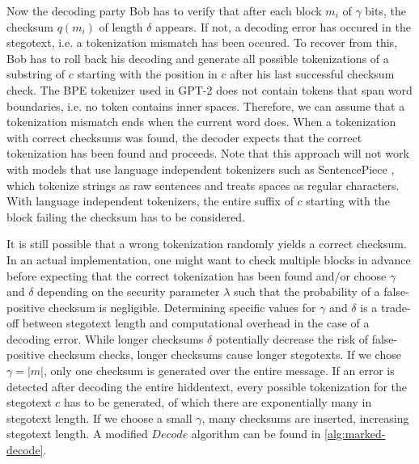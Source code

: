Now the decoding party Bob has to verify that after each block $m_i$ of $\gamma$ bits, the checksum $q(m_i)$ of length $\delta$ appears.
If not, a decoding error has occured in the stegotext, i.e. a tokenization mismatch has been occured.
To recover from this, Bob has to roll back his decoding and generate all possible tokenizations of a substring of $c$ starting with the position in $c$ after his last successful checksum check.
The BPE tokenizer used in GPT-2 does not contain tokens that span word boundaries, i.e. no token contains inner spaces. Therefore, we can assume that a tokenization mismatch ends when the current word does.
When a tokenization with correct checksums was found, the decoder expects that the correct tokenization has been found and proceeds.
Note that this approach will not work with models that use language independent tokenizers such as SentencePiece \cite{SentencePiece2018}, which tokenize strings as raw sentences and treats spaces as regular characters.
With language independent tokenizers, the entire suffix of $c$ starting with the block failing the checksum has to be considered.

It is still possible that a wrong tokenization randomly yields a correct checksum.
In an actual implementation, one might want to check multiple blocks in advance before expecting that the correct tokenization has been found and/or choose $\gamma$ and $\delta$ depending on the security parameter $\lambda$ such that the probability of a false-positive checksum is negligible.
Determining specific values for $\gamma$ and $\delta$ is a trade-off between stegotext length and computational overhead in the case of a decoding error.
While longer checksums $\delta$ potentially decrease the risk of false-positive checksum checks, longer checksums cause longer stegotexts.
If we chose $\gamma = |m|$, only one checksum is generated over the entire message. 
If an error is detected after decoding the entire hiddentext, every possible tokenization for the stegotext $c$ has to be generated, of which there are exponentially many in stegotext length.
If we choose a small $\gamma$, many checksums are inserted, increasing stegotext length.
A modified $Decode$ algorithm can be found in \autoref{alg:marked-decode}.

